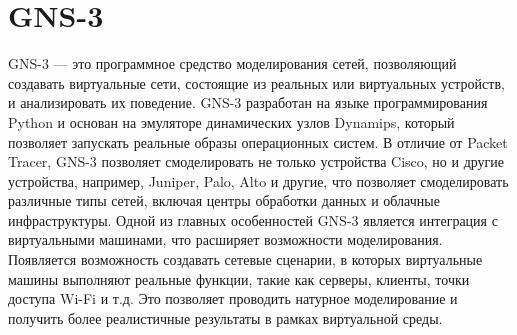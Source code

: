 \section{GNS-3}
\label{chap1:sec4}


GNS-3 — это программное средство моделирования сетей, позволяющий
создавать виртуальные сети, состоящие из реальных или виртуальных
устройств, и анализировать их поведение. GNS-3 разработан на языке
программирования Python и основан на эмуляторе динамических узлов
Dynamips, который позволяет запускать реальные образы операционных
систем. В отличие от Packet Tracer, GNS-3 позволяет смоделировать не
только устройства Cisco, но и другие устройства, например, Juniper,
Palo, Alto и другие, что позволяет смоделировать различные типы сетей,
включая центры обработки данных и облачные инфраструктуры. Одной из
главных особенностей GNS-3 является интеграция с виртуальными
машинами, что расширяет возможности моделирования. Появляется
возможность создавать сетевые сценарии, в которых виртуальные машины
выполняют реальные функции, такие как серверы, клиенты, точки доступа
Wi-Fi и т.д. Это позволяет проводить натурное моделирование и
получить более реалистичные результаты в рамках виртуальной среды.


